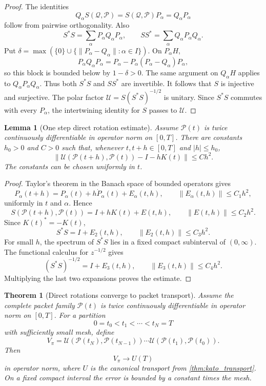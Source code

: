 \documentclass[11pt,a4paper]{article}
\newtheorem{theorem}{Theorem}[section]
\theoremstyle{plain}
\newtheorem{lemma}[lemma]{Lemma}
\theoremstyle{definition}
\theoremstyle{remark}
\newcommand{\Pcal}{\mathcal P}
\newcommand{\Qcal}{\mathcal Q}
\newcommand{\Ucal}{\mathcal U}
\begin{document}
\begin{proof}
The identities
\[
Q_\alpha S(\Qcal,\Pcal)
=
S(\Qcal,\Pcal)P_\alpha
=
Q_\alpha P_\alpha
\]
follow from pairwise orthogonality.  Also
\[
S^*S
=
\sum_\alpha P_\alpha Q_\alpha P_\alpha,
\qquad
SS^*
=
\sum_\alpha Q_\alpha P_\alpha Q_\alpha.
\]
Put $\delta=\max(\{0\}\cup\{\|P_\alpha-Q_\alpha\|:\alpha\in I\})$.  On $P_\alpha H$,
\[
P_\alpha Q_\alpha P_\alpha
=
P_\alpha-P_\alpha(P_\alpha-Q_\alpha)P_\alpha,
\]
so this block is bounded below by $1-\delta>0$.  The same argument on $Q_\alpha H$ applies to $Q_\alpha P_\alpha Q_\alpha$.  Thus both $S^*S$ and $SS^*$ are invertible.  It follows that $S$ is injective and surjective.  The polar factor $\Ucal=S(S^*S)^{-1/2}$ is unitary.  Since $S^*S$ commutes with every $P_\alpha$, the intertwining identity for $S$ passes to $\Ucal$.
\end{proof}

\begin{lemma}[One step direct rotation estimate]\label{lem:one_step_direct_rotation}
Assume $\Pcal(t)$ is twice continuously differentiable in operator norm on $[0,T]$.  There are constants $h_0>0$ and $C>0$ such that, whenever $t,t+h\in[0,T]$ and $|h|\le h_0$,
\[
\left\|
\Ucal(\Pcal(t+h),\Pcal(t))
-
I
-
hK(t)
\right\|
\le
Ch^2.
\]
The constants can be chosen uniformly in $t$.
\end{lemma}

\begin{proof}
Taylor's theorem in the Banach space of bounded operators gives
\[
P_\alpha(t+h)
=
P_\alpha(t)+h\dot P_\alpha(t)+E_{\alpha}(t,h),
\qquad
\|E_{\alpha}(t,h)\|\le C_1h^2,
\]
uniformly in $t$ and $\alpha$.  Hence
\[
S(\Pcal(t+h),\Pcal(t))
=
I+hK(t)+E(t,h),
\qquad
\|E(t,h)\|\le C_2h^2.
\]
Since $K(t)^*=-K(t)$,
\[
S^*S=I+E_2(t,h),
\qquad
\|E_2(t,h)\|\le C_3h^2.
\]
For small $h$, the spectrum of $S^*S$ lies in a fixed compact subinterval of $(0,\infty)$.  The functional calculus for $z^{-1/2}$ gives
\[
(S^*S)^{-1/2}=I+E_3(t,h),
\qquad
\|E_3(t,h)\|\le C_4h^2.
\]
Multiplying the last two expansions proves the estimate.
\end{proof}

\begin{theorem}[Direct rotations converge to packet transport]\label{thm:direct_rotation_convergence}
Assume the complete packet family $\Pcal(t)$ is twice continuously differentiable in operator norm on $[0,T]$.  For a partition
\[
0=t_0<t_1<\cdots<t_N=T
\]
with sufficiently small mesh, define
\[
V_\pi
=
\Ucal(\Pcal(t_N),\Pcal(t_{N-1}))
\cdots
\Ucal(\Pcal(t_1),\Pcal(t_0)).
\]
Then
\[
V_\pi\longrightarrow U(T)
\]
in operator norm, where $U$ is the canonical transport from \cref{thm:kato_transport}.  On a fixed compact interval the error is bounded by a constant times the mesh.
\end{theorem}
\end{document}
